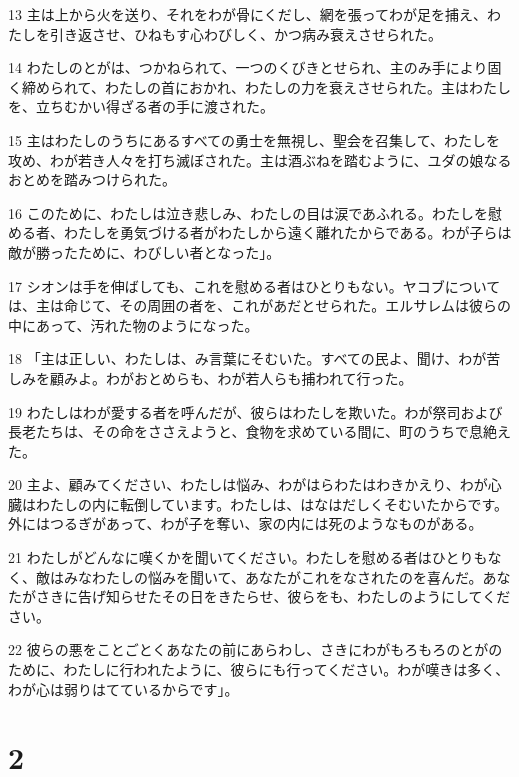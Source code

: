 \par 13 主は上から火を送り、それをわが骨にくだし、網を張ってわが足を捕え、わたしを引き返させ、ひねもす心わびしく、かつ病み衰えさせられた。
\par 14 わたしのとがは、つかねられて、一つのくびきとせられ、主のみ手により固く締められて、わたしの首におかれ、わたしの力を衰えさせられた。主はわたしを、立ちむかい得ざる者の手に渡された。
\par 15 主はわたしのうちにあるすべての勇士を無視し、聖会を召集して、わたしを攻め、わが若き人々を打ち滅ぼされた。主は酒ぶねを踏むように、ユダの娘なるおとめを踏みつけられた。
\par 16 このために、わたしは泣き悲しみ、わたしの目は涙であふれる。わたしを慰める者、わたしを勇気づける者がわたしから遠く離れたからである。わが子らは敵が勝ったために、わびしい者となった」。
\par 17 シオンは手を伸ばしても、これを慰める者はひとりもない。ヤコブについては、主は命じて、その周囲の者を、これがあだとせられた。エルサレムは彼らの中にあって、汚れた物のようになった。
\par 18 「主は正しい、わたしは、み言葉にそむいた。すべての民よ、聞け、わが苦しみを顧みよ。わがおとめらも、わが若人らも捕われて行った。
\par 19 わたしはわが愛する者を呼んだが、彼らはわたしを欺いた。わが祭司および長老たちは、その命をささえようと、食物を求めている間に、町のうちで息絶えた。
\par 20 主よ、顧みてください、わたしは悩み、わがはらわたはわきかえり、わが心臓はわたしの内に転倒しています。わたしは、はなはだしくそむいたからです。外にはつるぎがあって、わが子を奪い、家の内には死のようなものがある。
\par 21 わたしがどんなに嘆くかを聞いてください。わたしを慰める者はひとりもなく、敵はみなわたしの悩みを聞いて、あなたがこれをなされたのを喜んだ。あなたがさきに告げ知らせたその日をきたらせ、彼らをも、わたしのようにしてください。
\par 22 彼らの悪をことごとくあなたの前にあらわし、さきにわがもろもろのとがのために、わたしに行われたように、彼らにも行ってください。わが嘆きは多く、わが心は弱りはてているからです」。

\chapter{2}

